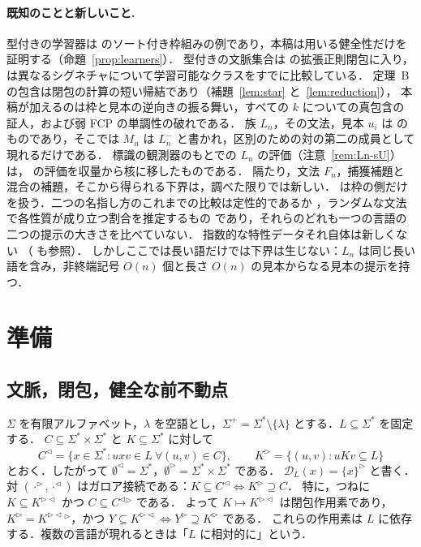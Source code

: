 \documentclass[11pt,a4paper]{ltjsarticle}
\numberwithin{equation}{section}
\theoremstyle{plain}
\theoremstyle{definition}
\theoremstyle{remark}
\theoremstyle{plain}
\newcommand{\eps}{\lambda}
\newcommand{\R}{^{\rhd}}
\newcommand{\Lc}{^{\lhd}}
\newcommand{\RL}{^{\rhd\lhd}}
\newcommand{\D}{\mathcal D}
\begin{document}
\paragraph{既知のことと新しいこと.}
型付きの学習器は \citet{yoshinaka2015} のソート付き枠組みの例であり，本稿は用いる健全性だけを証明する（命題~\ref{prop:learners}）．
型付きの文脈集合は \citet{ky2023} の拡張正則閉包に入り，
\citet[Sec.~8]{yoshinaka2015} は異なるシグネチャについて学習可能なクラスをすでに比較している．
定理~B の包含は閉包の計算の短い帰結であり（補題~\ref{lem:star} と~\ref{lem:reduction}），
本稿が加えるのは枠と見本の逆向きの振る舞い，すべての $k$ についての真包含の証人，および弱 FCP の単調性の破れである．
族 $L_n$，その文法，見本 $u_i$ は \citet[Sec.~6]{kuriyama-tcs1} のものであり，そこでは $M_n$ は $L_n^-$ と書かれ，区別のための対の第二の成員として現れるだけである．
標識の観測器のもとでの $L_n$ の評価（注意~\ref{rem:Ln-sU}）は，\citet[式~($\spadesuit$)，Cor.~6.6]{kuriyama-tcs1} の評価を収量から核に移したものである．
隔たり，文法 $F_n$，捕獲補題と混合の補題，そこから得られる下界は，調べた限りでは新しい．\citet{ky2023} は枠の側だけを扱う．二つの名指し方のこれまでの比較は定性的であるか \citep{yoshinaka2011dlt,yoshinaka2012lata,ky2021}，ランダムな文法で各性質が成り立つ割合を推定するもの \citep{clark2016icgi} であり，それらのどれも一つの言語の二つの提示の大きさを比べていない．
指数的な特性データそれ自体は新しくない \citep[Example~2]{clark-eyraud2007}（\citealp{coste-nicolas2019} も参照）．
しかしここでは長い語だけでは下界は生じない：$L_n$ は同じ長い語を含み，非終端記号 $O(n)$ 個と長さ $O(n)$ の見本からなる見本の提示を持つ．

\section{準備}\label{sec:prelim}

\subsection*{文脈，閉包，健全な前不動点}
$\Sigma$ を有限アルファベット，$\eps$ を空語とし，$\Sigma^+=\Sigma^*\setminus\{\eps\}$ とする．$L\subseteq\Sigma^*$ を固定する．
$C\subseteq\Sigma^*\times\Sigma^*$ と $K\subseteq\Sigma^*$ に対して
\[
C\Lc=\{x\in\Sigma^*: uxv\in L\ \forall(u,v)\in C\},\qquad
K\R=\{(u,v): uKv\subseteq L\}
\]
とおく．したがって $\emptyset\Lc=\Sigma^*$，$\emptyset\R=\Sigma^*\times\Sigma^*$ である．
$\D_L(x)=\{x\}\R$ と書く．対 $(\cdot\R,\cdot\Lc)$ はガロア接続である：$K\subseteq C\Lc\iff K\R\supseteq C$．
特に，つねに $K\subseteq K\RL$ かつ $C\subseteq C\Lc{}\R$ である．
よって $K\mapsto K\RL$ は閉包作用素であり，$K\R=K\RL{}\R$，かつ $Y\subseteq K\RL\iff Y\R\supseteq K\R$ である．
これらの作用素は $L$ に依存する．複数の言語が現れるときは「$L$ に相対的に」という．
\end{document}
